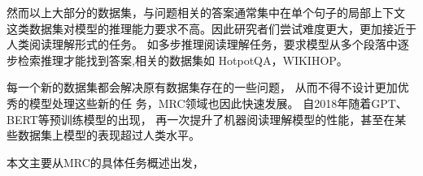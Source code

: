 然而以上大部分的数据集，与问题相关的答案通常集中在单个句子的局部上下文
这类数据集对模型的推理能力要求不高。因此研究者们尝试难度更大，更加接近于人类阅读理解形式的任务。
如多步推理阅读理解任务，要求模型从多个段落中逐步检索推理才能找到答案,相关的数据集如
HotpotQA，WIKIHOP。


每一个新的数据集都会解决原有数据集存在的一些问题，
从而不得不设计更加优秀的模型处理这些新的任
务，MRC领域也因此快速发展。
自2018年随着GPT、BERT等预训练模型的出现，
再一次提升了机器阅读理解模型的性能，甚至在某些数据集上模型的表现超过人类水平。

本文主要从MRC的具体任务概述出发，
%
%
